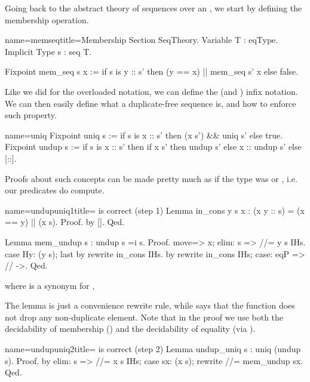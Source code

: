 Going back to the abstract theory of sequences over an ,
we start by defining the membership operation.

\begin{coq}{name=memseq}{title=Membership}
Section SeqTheory.
Variable T : eqType.
Implicit Type s : seq T.

Fixpoint mem_seq s x :=
  if s is y :: s' then (y == x) || mem_seq s' x else false.
\end{coq}

Like we did for the overloaded \C{==} notation, we can define the
\C{\\in} (and \C{\\notin}) infix notation.  We can then easily
define what a duplicate-free sequence is, and how to enforce such
property.

\begin{coq}{name=uniq}{}
Fixpoint uniq s :=
  if s is x :: s' then (x \notin s') && uniq s' else true.
Fixpoint undup s :=
  if s is x :: s' then
    if x \in s' then undup s' else x :: undup s'
  else [::].
\end{coq}

Proofs about such concepts can be made pretty much as if
the type  was  or , i.e. our predicates do
compute.

\begin{coq}{name=undupuniq1}{title= is correct (step 1)}
Lemma in_cons y s x : (x \in y :: s) = (x == y) || (x \in s).
Proof. by []. Qed.

Lemma mem_undup s : undup s =i s.
Proof.
move=> x; elim: s => //= y s IHs.
case Hy: (y \in s); last by rewrite in_cons IHs.
by rewrite in_cons IHs; case: eqP => // ->.
Qed.
\end{coq}
where  is a synonym for ,

The  lemma is just a convenience rewrite rule, while
 says that the  function does not drop
any non-duplicate element.  Note that in the proof we use both
the decidability of membership () and the decidability of
equality (via ).

\begin{coq}{name=undupuniq2}{title= is correct (step 2)}
Lemma undup_uniq s : uniq (undup s).
Proof.
by elim: s => //= x s IHs; case sx: (x \in s); rewrite //= mem_undup sx.
Qed.
\end{coq}

